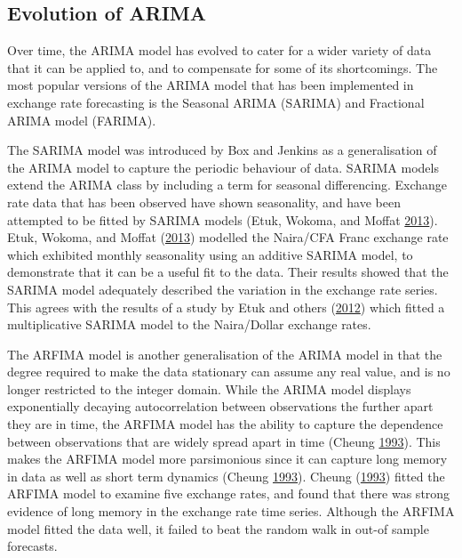 \documentclass[12pt,preprint, authoryear]{elsarticle}
\numberwithin{equation}{section}
\numberwithin{figure}{section}
\numberwithin{table}{section}
\begin{document}
\subsection{Evolution of ARIMA}\label{evolution-of-arima}

Over time, the ARIMA model has evolved to cater for a wider variety of
data that it can be applied to, and to compensate for some of its
shortcomings. The most popular versions of the ARIMA model that has been
implemented in exchange rate forecasting is the Seasonal ARIMA (SARIMA)
and Fractional ARIMA model (FARIMA).

The SARIMA model was introduced by Box and Jenkins as a generalisation
of the ARIMA model to capture the periodic behaviour of data. SARIMA
models extend the ARIMA class by including a term for seasonal
differencing. Exchange rate data that has been observed have shown
seasonality, and have been attempted to be fitted by SARIMA models
(Etuk, Wokoma, and Moffat \protect\hyperlink{ref-etuk2013}{2013}). Etuk,
Wokoma, and Moffat (\protect\hyperlink{ref-etuk2013}{2013}) modelled the
Naira/CFA Franc exchange rate which exhibited monthly seasonality using
an additive SARIMA model, to demonstrate that it can be a useful fit to
the data. Their results showed that the SARIMA model adequately
described the variation in the exchange rate series. This agrees with
the results of a study by Etuk and others
(\protect\hyperlink{ref-etuk2012}{2012}) which fitted a multiplicative
SARIMA model to the Naira/Dollar exchange rates.

The ARFIMA model is another generalisation of the ARIMA model in that
the degree required to make the data stationary can assume any real
value, and is no longer restricted to the integer domain. While the
ARIMA model displays exponentially decaying autocorrelation between
observations the further apart they are in time, the ARFIMA model has
the ability to capture the dependence between observations that are
widely spread apart in time (Cheung
\protect\hyperlink{ref-cheung1993}{1993}). This makes the ARFIMA model
more parsimonious since it can capture long memory in data as well as
short term dynamics (Cheung \protect\hyperlink{ref-cheung1993}{1993}).
Cheung (\protect\hyperlink{ref-cheung1993}{1993}) fitted the ARFIMA
model to examine five exchange rates, and found that there was strong
evidence of long memory in the exchange rate time series. Although the
ARFIMA model fitted the data well, it failed to beat the random walk in
out-of sample forecasts.
\end{document}
